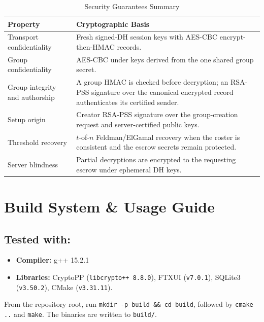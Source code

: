 \documentclass[11pt,a4paper]{article}
\begin{document}
\begin{table}[htbp]
	\centering
	\small
	\begin{tabularx}{\textwidth}{l X}
		\toprule
		\textbf{Property} & \textbf{Cryptographic Basis}                                                   \\
		\midrule
		Transport confidentiality & Fresh signed-DH session keys with AES-CBC encrypt-then-HMAC records. \\
		Group confidentiality & AES-CBC under keys derived from the one shared group secret.           \\
		Group integrity and authorship & A group HMAC is checked before decryption; an RSA-PSS signature over the canonical encrypted record authenticates its certified sender. \\
		Setup origin & Creator RSA-PSS signature over the group-creation request and server-certified public keys. \\
		Threshold recovery & $t$-of-$n$ Feldman/ElGamal recovery when the roster is consistent and the escrow secrets remain protected. \\
		Server blindness  & Partial decryptions are encrypted to the requesting escrow under ephemeral DH keys. \\
		\bottomrule
	\end{tabularx}
\caption{Security Guarantees Summary}
\label{tab:security}
\end{table}

\section{Build System \& Usage Guide}
\label{sec:build}

\subsection{Tested with:}
\begin{itemize}
	\item \textbf{Compiler:} g++ 15.2.1
	\item \textbf{Libraries:} CryptoPP (\texttt{libcrypto++ 8.8.0}), 
	FTXUI (\texttt{v7.0.1}), SQLite3 (\texttt{v3.50.2}), CMake (\texttt{v3.31.11}).
\end{itemize}

From the repository root, run \texttt{mkdir -p build \&\& cd build}, followed by \texttt{cmake ..} and \texttt{make}. The binaries are written to \texttt{build/}.
\end{document}
